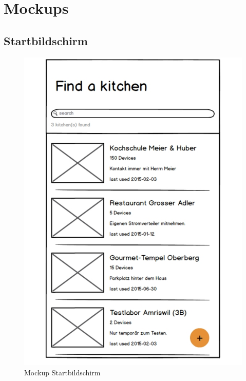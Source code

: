 
\section{Mockups}
\label{sec:Mockups}

\subsection{Startbildschirm}
\label{subsec:Startbildschirm}

\begin{figure}
	\begin{center}
		\includegraphics[page=1,trim=0 0 0 0,clip,scale=0.21]{uiux/res/mockups}
		\caption{Mockup Startbildschirm}
	    \label{abb:mockStartScreen}
	\end{center}
\end{figure}

